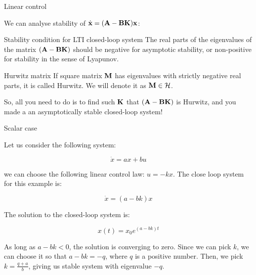 \documentclass{beamer}
\begin{document}
\begin{frame}{Linear control}
\begin{flushleft}

We can analyse stability of $\dot{\mathbf{x}} = (\mathbf{A} - \mathbf{B}\mathbf{K})\mathbf{x}$:

\begin{block}{Stability condition for LTI closed-loop system}
The real parts of the eigenvalues of the matrix $(\mathbf{A} - \mathbf{B}\mathbf{K})$ should be negative for asymptotic stability, or non-positive for stability in the sense of Lyapunov.
\end{block}

\begin{block}{Hurwitz matrix}
	If square matrix $\mathbf{M}$ has eigenvalues with strictly negative real parts, it is called Hurwitz. We will denote it as $\mathbf{M} \in \mathcal{H}$.
\end{block}


So, all you need to do is to find such $\mathbf{K}$ that $(\mathbf{A} - \mathbf{B}\mathbf{K})$ is Hurwitz, and you made a an asymptotically stable closed-loop system!

\end{flushleft}
\end{frame}




\begin{frame}{Scalar case}
	\begin{flushleft}
		
		Let us consider the following system:
		
		\begin{equation}
			\dot x = a x + b u
		\end{equation}
	
		we can choose the following linear control law: $u = - k x$. The close loop system for this example is:
		
		\begin{equation}
			\dot x = (a- bk) x
		\end{equation}		
	
		The solution to the closed-loop system is:
		
		\begin{equation}
			x(t) =  x_0 e^{(a- bk)t}
		\end{equation}		
		
		As long as $a- bk < 0$, the solution is converging to zero. Since we can pick $k$, we can choose it so that $a- bk = -q$, where $q$ is a positive number. Then, we pick $k = \frac{q+a}{b}$, giving us stable system with eigenvalue $-q$.
		
	\end{flushleft}
\end{frame}
\end{document}
